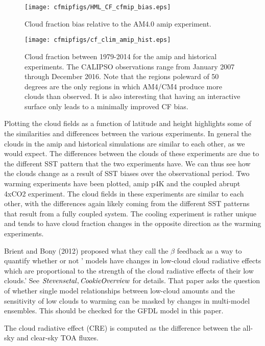 \documentclass[11pt]{article}   	%
\begin{document}
\begin{figure}
  \texttt{[image: cfmipfigs/HML\_CF\_cfmip\_bias.eps]}
  \caption{Cloud fraction bias relative to the AM4.0 amip experiment.}
  \label{fig:cf_hml_bias}
\end{figure}

\begin{figure}
  \texttt{[image: cfmipfigs/cf\_clim\_amip\_hist.eps]}
  \caption{Cloud fraction between 1979-2014 for the amip and historical experiments.  The CALIPSO
  observations range from January 2007 through December 2016.  Note that the regions poleward of
  50 degrees are the only regions in which AM4/CM4 produce more clouds than observed.  It is 
  also interesting that having an interactive surface only leads to a minimally improved CF bias.}
  \label{fig:calipso_amip_comparison}
\end{figure}

Plotting the cloud fields as a function of latitude and height highlights some of the similarities and differences 
between the various experiments.  In general the clouds in the amip and historical simulations are similar to 
each other, as we would expect.  The differences between the clouds of these experiments are due to the 
different SST pattern that the two experiments have.  We can thus see how the clouds change as a result 
of SST biases over the observational period.  Two warming experiments have been plotted, amip p4K and 
the coupled abrupt 4xCO2 experiment.  The cloud fields in these experiments are similar to each other, with 
the differences again likely coming from the different SST patterns that result from a fully coupled system.  The 
cooling experiment is rather unique and tends to have cloud fraction changes in the opposite direction as 
the warming experiments.    

Brient and Bony (2012) proposed what they call the $\beta$ feedback as a way to quantify whether or not ' models have 
changes in low-cloud cloud radiative effects which are proportional to the strength of the cloud radiative effects of their
low clouds.'  See $\it{Stevens etal, Cookie Overview}$ for details.   That paper asks the question of whether single 
model relationships between low-cloud amounts and the sensitivity of low clouds to warming can be 
masked by changes in multi-model ensembles.  This should be checked for the GFDL model in this paper.  

The cloud radiative effect (CRE) is computed as the difference between the all-sky and clear-sky TOA fluxes.  
\end{document}
